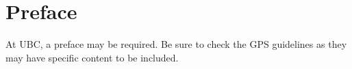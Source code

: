 
\chapter{Preface}

At \ac{UBC}, a preface may be required.  Be sure to check the
\ac{GPS} guidelines as they may have specific content to be included.
